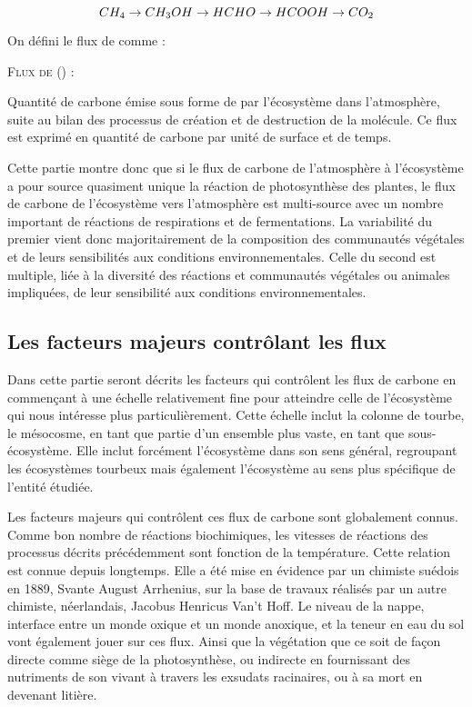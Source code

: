 $$
CH_{4} \rightarrow CH_{3}OH \rightarrow HCHO \rightarrow HCOOH \rightarrow CO_{2} \\
$$

On défini le flux de \chh comme : 
\begin{pdef}
\textsc{Flux de \chh (\fchh)} :

Quantité de carbone émise sous forme de \chh par l'écosystème dans l'atmosphère, suite au bilan des processus de création et de destruction de la molécule.
Ce flux est exprimé en quantité de carbone par unité de surface et de temps.
\end{pdef}




Cette partie montre donc que si le flux de carbone de l'atmosphère à l'écosystème a pour source quasiment unique la réaction de photosynthèse des plantes, le flux de carbone de l'écosystème vers l'atmosphère est multi-source avec un nombre important de réactions de respirations et de fermentations.
La variabilité du premier vient donc majoritairement de la composition des communautés végétales et de leurs sensibilités aux conditions environnementales.
Celle du second est multiple, liée à la diversité des réactions et communautés végétales ou animales impliquées, de leur sensibilité aux conditions environnementales.

\subsection{Les facteurs majeurs contrôlant les flux}

Dans cette partie seront décrits les facteurs qui contrôlent les flux de carbone en commençant à une échelle relativement fine pour atteindre celle de l'écosystème qui nous intéresse plus particulièrement.
Cette échelle inclut la colonne de tourbe, le mésocosme, en tant que partie d'un ensemble plus vaste, en tant que sous-écosystème. 
Elle inclut forcément l'écosystème dans son sens général, regroupant les écosystèmes tourbeux mais également l'écosystème au sens plus spécifique de l'entité étudiée.

Les facteurs majeurs qui contrôlent ces flux de carbone sont globalement connus.
Comme bon nombre de réactions biochimiques, les vitesses de réactions des processus décrits précédemment sont fonction de la température.
Cette relation est connue depuis longtemps.
Elle a été mise en évidence par un chimiste suédois en 1889, Svante August Arrhenius, sur la base de travaux réalisés par un autre chimiste, néerlandais, Jacobus Henricus Van't Hoff.
Le niveau de la nappe, interface entre un monde oxique et un monde anoxique, et la teneur en eau du sol vont également jouer sur ces flux.
Ainsi que la végétation  que ce soit de façon directe comme siège de la photosynthèse, ou indirecte en fournissant des nutriments de son vivant à travers les exsudats racinaires, ou à sa mort en devenant litière.


